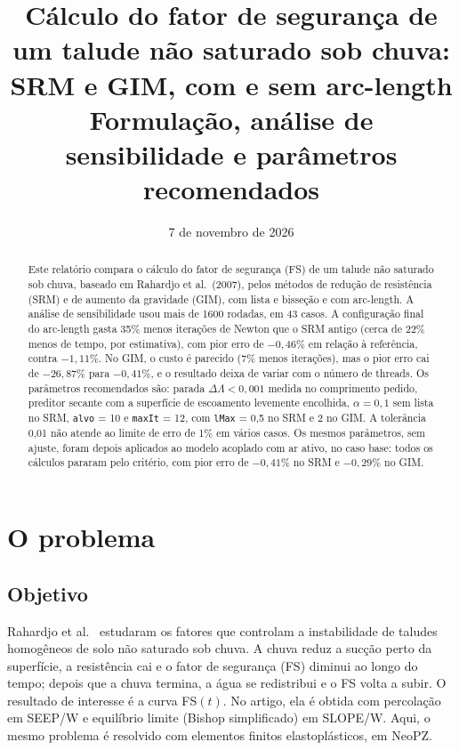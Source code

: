 \documentclass[11pt,a4paper]{article}
\title{Cálculo do fator de segurança de um talude não saturado sob chuva:\\
SRM e GIM, com e sem arc-length\\[3pt]
\large Formulação, análise de sensibilidade e parâmetros recomendados}
\author{}
\date{7 de novembro de 2026}
\numberwithin{equation}{section}
\begin{document}
\maketitle

\vspace{-1.5em}

\begin{abstract}
Este relatório compara o cálculo do fator de segurança (FS) de um talude não saturado sob chuva, baseado em Rahardjo et al.\ (2007), pelos métodos de redução de resistência (SRM) e de aumento da gravidade (GIM), com lista e bisseção e com arc-length. A análise de sensibilidade usou mais de 1600 rodadas, em 43 casos. A configuração final do arc-length gasta 35\% menos iterações de Newton que o SRM antigo (cerca de 22\% menos de tempo, por estimativa), com pior erro de $-0{,}46\%$ em relação à referência, contra $-1{,}11\%$. No GIM, o custo é parecido (7\% menos iterações), mas o pior erro cai de $-26{,}87\%$ para $-0{,}41\%$, e o resultado deixa de variar com o número de threads. Os parâmetros recomendados são: parada $\Delta\Lambda < 0{,}001$ medida no comprimento pedido, preditor secante com a superfície de escoamento levemente encolhida, $\alpha = 0{,}1$ sem lista no SRM, \texttt{alvo} = 10 e \texttt{maxIt} = 12, com \texttt{lMax} = 0,5 no SRM e 2 no GIM. A tolerância 0,01 não atende ao limite de erro de 1\% em vários casos. Os mesmos parâmetros, sem ajuste, foram depois aplicados ao modelo acoplado com ar ativo, no caso base: todos os cálculos pararam pelo critério, com pior erro de $-0{,}41\%$ no SRM e $-0{,}29\%$ no GIM.
\end{abstract}


\tableofcontents

\section{O problema}\label{sec:problema}

\subsection{Objetivo}

Rahardjo et al.~\cite{rahardjo2007} estudaram os fatores que controlam a instabilidade de taludes homogêneos de solo não saturado
sob chuva. A chuva reduz a sucção perto da superfície, a resistência cai e o fator de segurança (FS) diminui ao longo do
tempo; depois que a chuva termina, a água se redistribui e o FS volta a subir. O resultado de interesse é a curva FS$(t)$. No
artigo, ela é obtida com percolação em SEEP/W e equilíbrio limite (Bishop simplificado) em SLOPE/W. Aqui, o mesmo problema
é resolvido com elementos finitos elastoplásticos, em NeoPZ.
\end{document}
